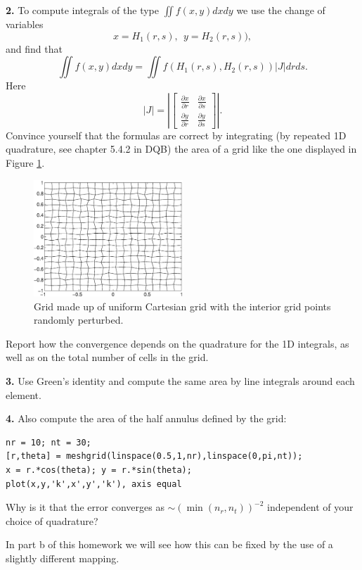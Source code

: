\documentclass[12pt]{article}
\begin{document}
\flushleft
{\bf 2.} To compute integrals of the type $\iint f(x,y) dx dy $ we use the change of variables 
\[
x = H_1(r,s),\ \ y = H_2(r,s)),
\]
 and find that 
 \[
 \iint f(x,y) dx dy = \iint f(H_1(r,s),H_2(r,s)) | J | dr ds. 
 \]
 Here 
 \[
  | J | = \left| \left[  \begin{array}{cc}
  \frac{\partial x}{\partial r} & \frac{\partial x}{\partial s} \\
  \frac{\partial y}{\partial r} & \frac{\partial y}{\partial s}
   \end{array} \right] \right|.
  \]
Convince yourself that the formulas are correct by integrating (by repeated 1D quadrature, see chapter 5.4.2 in DQB) the area of a grid like the one displayed in Figure \ref{Fig:Grid}.
\begin{figure}[h]
  \begin{center}
  \includegraphics[width=0.5\textwidth]{grid}
  \caption{Grid made up of uniform Cartesian grid with the interior grid points randomly perturbed. \label{Fig:Grid}}
  \end{center}
\end{figure}
Report how the convergence depends on the quadrature for the 1D integrals, as well as on the total number of cells in the grid.

\flushleft
{\bf 3.} Use Green's identity and compute the same area by line integrals around each element. 

\flushleft
{\bf 4.} Also compute the area of the half annulus defined by the grid:
\begin{verbatim}
nr = 10; nt = 30; 
[r,theta] = meshgrid(linspace(0.5,1,nr),linspace(0,pi,nt));
x = r.*cos(theta); y = r.*sin(theta); 
plot(x,y,'k',x',y','k'), axis equal
\end{verbatim}

Why is it that the error converges as $\sim (\min (n_r,n_t))^{-2} $ independent of your choice of quadrature? 

In part b of this homework we will see how this can be fixed by the use of a slightly different mapping. 
\end{document}
